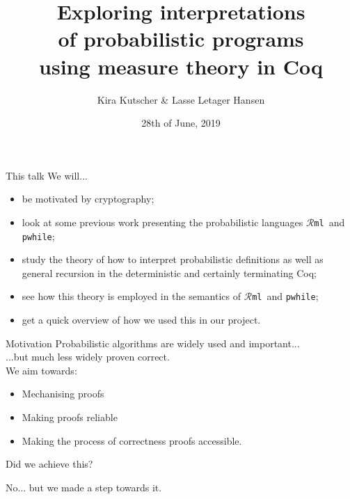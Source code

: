 \documentclass{beamer}
\title{Exploring interpretations \\ of probabilistic programs \\ using measure theory in Coq}
\author{Kira Kutscher \& Lasse Letager Hansen}
\date{28th of June, 2019}
\begin{document}
\newcommand\rml{$\mathcal{R}$\texttt{ml}} %
\maketitle


\begin{frame}{This talk}
  We will...
  \pause
  \begin{itemize}
      \item be motivated by cryptography;
  \pause
      \item look at some previous work presenting the probabilistic languages \rml\
    and \texttt{pwhile};
  \pause
      \item study the theory of how to interpret probabilistic definitions as well as
    general recursion in the deterministic and certainly terminating Coq; 
  \pause
    \item see how this theory is employed in the semantics of \rml\ and \texttt{pwhile};
  \pause
    \item get a quick overview of how we used this in our project. 
  \end{itemize}
\end{frame}


\begin{frame}{Motivation}
  Probabilistic algorithms are widely used and important...\\
    \pause
    ...but much less widely proven correct.\\
    \bigskip
    \pause
    We aim towards:
    \pause
    \begin{itemize}
        \item Mechanising proofs
      \pause
        \item Making proofs reliable
      \pause
        \item Making the process of correctness proofs accessible. 
    \end{itemize}
    \pause
    \bigskip
    \medskip
    Did we achieve this?
    \pause
    \begin{flushright}
      No... but we made a step towards it. 
    \end{flushright}
\end{frame}

\end{document}
